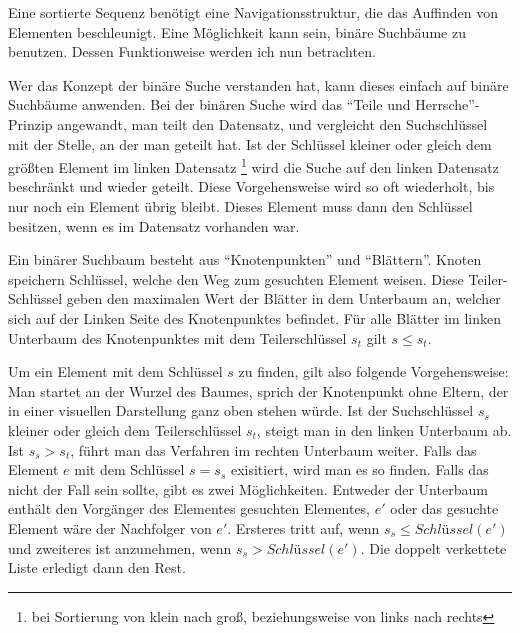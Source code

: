 Eine sortierte Sequenz benötigt eine Navigationsstruktur, die das Auffinden von Elementen beschleunigt. Eine Möglichkeit kann sein, binäre Suchbäume zu benutzen. Dessen Funktionweise werden ich nun betrachten.
\par
Wer das Konzept der binäre Suche verstanden hat, kann dieses einfach auf binäre Suchbäume anwenden. Bei der binären Suche wird das "`Teile und Herrsche"'-Prinzip angewandt, man teilt den Datensatz, und vergleicht den Suchschlüssel mit der Stelle, an der man geteilt hat. Ist der Schlüssel kleiner oder gleich dem größten Element im linken Datensatz \footnote{bei Sortierung von klein nach groß, beziehungsweise von links nach rechts} wird die Suche auf den linken Datensatz beschränkt und wieder geteilt. Diese Vorgehensweise wird so oft wiederholt, bis nur noch ein Element übrig bleibt. Dieses Element muss dann den Schlüssel besitzen, wenn es im Datensatz vorhanden war.
\par
Ein binärer Suchbaum besteht aus "`Knotenpunkten"' und "`Blättern"'. Knoten speichern Schlüssel, welche den Weg zum gesuchten Element weisen. Diese Teiler-Schlüssel geben den maximalen Wert der Blätter in dem Unterbaum an, welcher sich auf der Linken Seite des Knotenpunktes befindet. Für alle Blätter im linken Unterbaum des Knotenpunktes mit dem Teilerschlüssel $s_t$ gilt $s \leq s_t$.
\par
Um ein Element mit dem Schlüssel $s$ zu finden, gilt also folgende Vorgehensweise: Man startet an der Wurzel des Baumes, sprich der Knotenpunkt ohne Eltern, der in einer visuellen Darstellung ganz oben stehen würde. Ist der Suchschlüssel $s_s$ kleiner oder gleich dem Teilerschlüssel $s_t$, steigt man in den linken Unterbaum ab. Ist $s_s>s_t$, führt man das Verfahren im rechten Unterbaum weiter. Falls das Element $e$ mit dem Schlüssel $s=s_s$ exisitiert, wird man es so finden. Falls das nicht der Fall sein sollte, gibt es zwei Möglichkeiten. Entweder der Unterbaum enthält den Vorgänger des Elementes gesuchten Elementes, $e'$ oder das gesuchte Element wäre der Nachfolger von $e'$. Ersteres tritt auf, wenn $s_s \leq Schlüssel(e')$ und zweiteres ist anzunehmen, wenn $s_s>Schlüssel(e')$. \cite{Sanders:19} Die doppelt verkettete Liste erledigt dann den Rest.
\par
